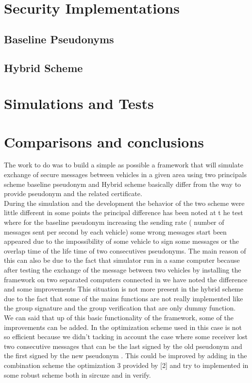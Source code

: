 \documentclass[a4paper,12pt]{article}
\def\baseline{Baseline Pseudonyms~}
\def\hybrid{Hybrid Scheme~}
\begin{document}
\section{Security Implementations}
\subsection{\baseline}

\subsection{\hybrid}

\section{Simulations and Tests}

\section{Comparisons and conclusions}
The work to do was to build a simple as possible a framework that will simulate exchange of secure messages between vehicles in a given area using two principals scheme baseline pseudonym and Hybrid scheme  basically differ  from the way to provide pseudonym  and the related certificate.\\
During the simulation and the development  the behavior of the two scheme were  little different in some points the principal difference has been noted at t he test where for the baseline  pseudonym increasing the sending rate ( number of messages sent per  second by each vehicle) some wrong messages start been appeared due to the impossibility of some vehicle to sign some messages or the overlap time of the life time of two consecutives pseudonyms. The main reason of this can also be due to the fact that simulator run in a same computer because after testing the exchange of the message between two vehicles by installing the framework on two separated computers connected in we have noted the difference and some improvements
This situation is not more present in the hybrid scheme due to the fact that some of the mains functions are not really implemented like the group signature and the group verification that are only dummy function.\\
We can said that up of this basic functionality of the framework, some of the improvements can be added.  In the optimization scheme used in this case is not so efficient because we didn't tacking in account the case where some receiver lost two consecutive messages that can be the last signed by the old pseudonym and the first signed by the  new pseudonym . This could be improved by adding in the combination scheme the optimization 3 provided by [2] and try to implemented in some robust scheme both in sircuze and in verify.\\
\end{document}
